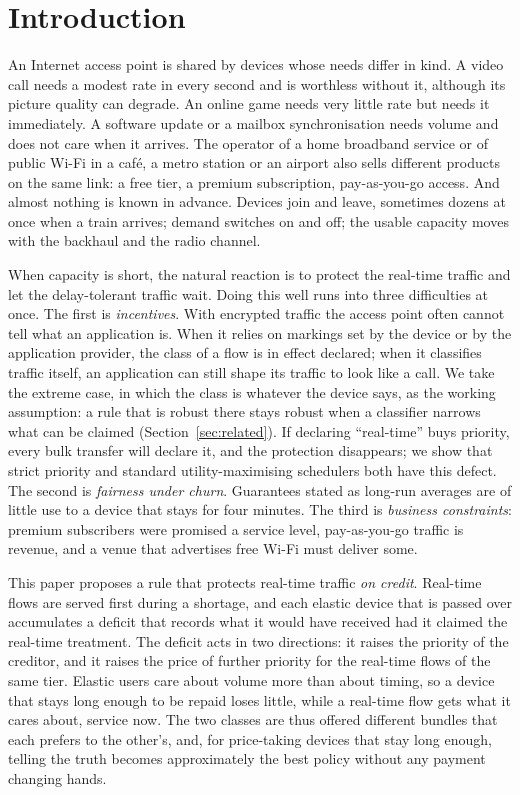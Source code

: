 \section{Introduction}\label{sec:intro}

An Internet access point is shared by devices whose needs differ in kind.
A video call needs a modest rate in every second and is worthless without it, although its picture quality can degrade.
An online game needs very little rate but needs it immediately.
A software update or a mailbox synchronisation needs volume and does not care when it arrives.
The operator of a home broadband service or of public Wi-Fi in a caf\'e, a metro station or an airport also sells different products on the same link: a free tier, a premium subscription, pay-as-you-go access.
And almost nothing is known in advance. Devices join and leave, sometimes dozens at once when a train arrives; demand switches on and off; the usable capacity moves with the backhaul and the radio channel.

When capacity is short, the natural reaction is to protect the real-time traffic and let the delay-tolerant traffic wait.
Doing this well runs into three difficulties at once.
The first is \emph{incentives}. With encrypted traffic the access point often cannot tell what an application is. When it relies on markings set by the device or by the application provider, the class of a flow is in effect declared; when it classifies traffic itself, an application can still shape its traffic to look like a call. We take the extreme case, in which the class is whatever the device says, as the working assumption: a rule that is robust there stays robust when a classifier narrows what can be claimed (Section~\ref{sec:related}).
If declaring ``real-time'' buys priority, every bulk transfer will declare it, and the protection disappears; we show that strict priority and standard utility-maximising schedulers both have this defect.
The second is \emph{fairness under churn}. Guarantees stated as long-run averages are of little use to a device that stays for four minutes.
The third is \emph{business constraints}: premium subscribers were promised a service level, pay-as-you-go traffic is revenue, and a venue that advertises free Wi-Fi must deliver some.

This paper proposes a rule that protects real-time traffic \emph{on credit}.
Real-time flows are served first during a shortage, and each elastic device that is passed over accumulates a deficit that records what it would have received had it claimed the real-time treatment.
The deficit acts in two directions: it raises the priority of the creditor, and it raises the price of further priority for the real-time flows of the same tier.
Elastic users care about volume more than about timing, so a device that stays long enough to be repaid loses little, while a real-time flow gets what it cares about, service now.
The two classes are thus offered different bundles that each prefers to the other's, and, for price-taking devices that stay long enough, telling the truth becomes approximately the best policy without any payment changing hands.


